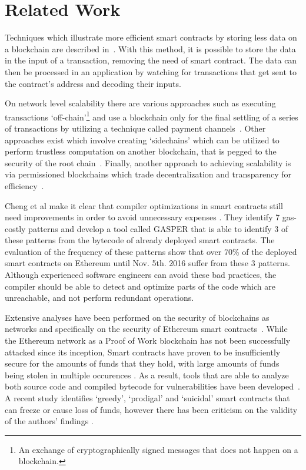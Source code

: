 \section{Related Work}
Techniques which illustrate more efficient smart contracts by storing less data on a blockchain are described in~\cite{stateless}. With this method, it is possible to store the data in the input of a transaction, removing the need of smart contract. The data can then be processed in an application by watching for transactions that get sent to the contract's address and decoding their inputs. 

On network level scalability there are various approaches such as executing transactions `off-chain'\footnote{An exchange of cryptographically signed messages that does not happen on a blockchain.} and use a blockchain only for the final settling of a series of transactions by utilizing a technique called payment channels~\cite{lightning, raiden, funfair, counterfactual}. Other approaches exist which involve creating `sidechains' which can be utilized to perform trustless computation on another blockchain, that is pegged to the security of the root chain~\cite{sidechains, loom, cosmos, plasmacash, plasma}. Finally, another approach to achieving scalability is via permissioned blockchains which trade decentralization and transparency for efficiency~\cite{hyperledger, Vukolic:2017:RPB:3055518.3055526}.

Cheng et al make it clear that compiler optimizations in smart contracts still need improvements in order to avoid unnecessary expenses \cite{DBLP:journals/corr/ChenLLZ17}. They identify 7 gas-costly patterns and develop a tool called GASPER that is able to identify 3 of these patterns from the bytecode of already deployed smart contracts. The evaluation of the frequency of these patterns show that over 70\% of the deployed smart contracts on Ethereum until Nov. 5th. 2016 suffer from these 3 patterns. Although experienced software engineers can avoid these bad practices, the compiler should be able to detect and optimize parts of the code which are unreachable, and not perform redundant operations.

Extensive analyses have been performed on the security of blockchains as networks and specifically on the security of Ethereum smart contracts~\cite{Gervais:2016:SPP:2976749.2978341, Atzei:2017:SAE:3080353.3080363}. While the Ethereum network as a Proof of Work blockchain has not been successfully attacked since its inception, Smart contracts have proven to be insufficiently secure for the amounts of funds that they hold, with large amounts of funds being stolen in multiple occurences \cite{parityhack, paritypostmortem, hackingdistibuteddao}. As a result, tools that are able to analyze both source code and compiled bytecode for vulnerabilities have been developed~\cite{Luu:2016:MSC:2976749.2978309, mythril, echidna, smartcheck, securify, zeus}. A recent study identifies `greedy', `prodigal' and `suicidal' smart contracts that can freeze or cause loss of funds, however there has been criticism on the validity of the authors' findings \cite{greedyprodigal, criticismgreedyprodigal}.

